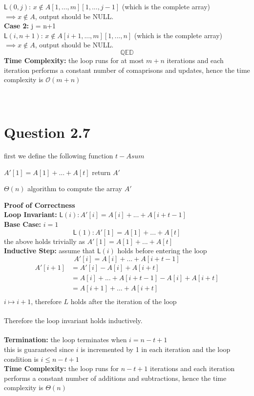 \documentclass{article}
\begin{document}
$\mathsf{L}(0, j)$: $x \notin A[1,...,m][1,...,j-1]$ (which is the complete array)\\
$\implies x \notin A$, output should be NULL.\\
\textbf{Case 2:} j = n+1\\
$\mathsf{L}(i, n+1)$: $x \notin A[i+1,...,m][1,...,n]$ (which is the complete array)\\
$\implies x \notin A$, output should be NULL.
$$\mathbb{Q} \mathbb{E} \mathbb{D} $$
\textbf{Time Complexity:} the loop runs for at most $m+n$ iterations and each iteration performs a constant number of comaprisons and updates, hence the time complexity is $\mathcal{O}(m+n)$\\\\
\\
\section*{Question 2.7}
first we define the following function $t-Asum$
\newpage
\begin{algorithm}
    $A'[1] = A[1]+...+A[t]$\;
    return $A'$\;
    \caption{$\varTheta(n)$ algorithm to compute the array $A'$} 
\end{algorithm}
\textbf{Proof of Correctness}\\
\textbf{Loop Invariant:} $\mathsf{L}(i): A'[i] = A[i]+...+A[i+t-1]$\\
\textbf{Base Case:} $i = 1$\\
$$\mathsf{L}(1): A'[1] = A[1]+...+A[t]$$
the above holds trivially as $A'[1] = A[1]+...+A[t]$\\
\textbf{Inductive Step:} assume that $\mathsf{L}(i)$ holds before entering the loop\\
$$A'[i] = A[i]+...+A[i+t-1]$$
\begin{align*}
    A'[i+1] &= A'[i] - A[i] + A[i+t]\\
    &= A[i]+...+A[i+t-1] - A[i] + A[i+t]\\
    &= A[i+1]+...+A[i+t]\\
\end{align*}
$i \mapsto i+1$, therefore $L$ holds after the iteration of the loop\\
\\
Therefore the loop invariant holds inductively.\\
\\
\textbf{Termination:} the loop terminates when $i = n-t+1$\\
this is guaranteed since $i$ is incremented by 1 in each iteration and the loop condition is $i \leq n-t+1$\\
\textbf{Time Complexity:} the loop runs for $n-t+1$ iterations and each iteration performs a constant number of additions and subtractions, hence the time complexity is $\varTheta(n)$\\\\
\end{document}
